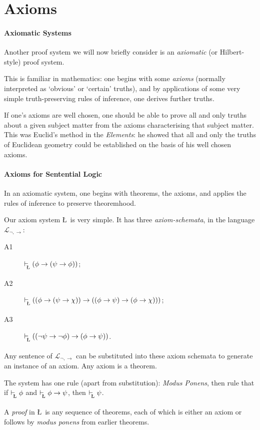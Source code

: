 {\section{Axioms}
\paragraph{Axiomatic Systems}

Another proof system we will now briefly consider is an \emph{axiomatic} (or Hilbert-style) proof system. 

This is familiar in mathematics: one begins with some \emph{axioms} (normally interpreted as `obvious' or `certain' truths), and by applications of some very simple truth-preserving rules of inference, one derives further truths.

If one's axioms are well chosen, one should be able to prove all and only truths about a given subject matter from the axioms characterising that subject matter. This was Euclid's method in the \emph{Elements}: he showed that all and only the truths of Euclidean geometry could be established on the basis of his well chosen axioms.

\paragraph{Axioms for Sentential Logic}

In an axiomatic system, one begins with theorems, the axioms, and applies the rules of inference to preserve theoremhood. 

Our axiom system \L\ is very simple. It has three \emph{axiom-schemata}, in the language $\mathcal{L}_{\neg,\to}$:
\begin{description}
	\item [A1] $\lvdash (\phi \to (\psi \to \phi))$;
	\item [A2]$\lvdash ((\phi \to (\psi \to \chi)) \to ((\phi \to \psi) \to (\phi \to \chi)))$;
	\item [A3] $\lvdash ((\neg \psi \to \neg \phi) \to (\phi \to \psi))$.
\end{description}
Any sentence of $\mathcal{L}_{\neg,\to}$ can be substituted into these axiom schemata to generate an instance of an axiom. Any axiom is a theorem.

The system has one rule (apart from substitution): \emph{\emph{Modus Ponens}}, then rule that if $\lvdash \phi$ and $\lvdash \phi\to\psi$, then $\lvdash\psi$. 

A \emph{proof} in \L\ is any sequence of theorems, each of which is either an axiom or follows by \emph{modus ponens} from earlier theorems.

}
